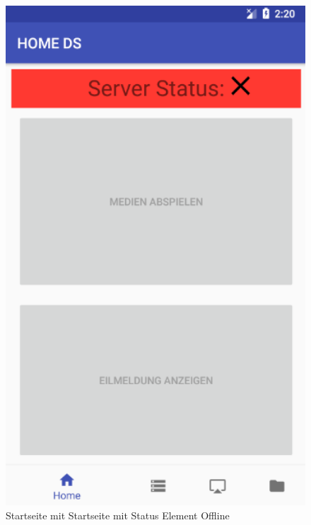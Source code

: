 \\
\\
\begin{figure}[H]
\centering
\includegraphics[width=1.0\textwidth]{images/06_AndroidApp/06_StatusOffline}
\caption{Startseite mit Startseite mit Status Element Offline}
\label{fig:mediaNav}
\end{figure}
\\
